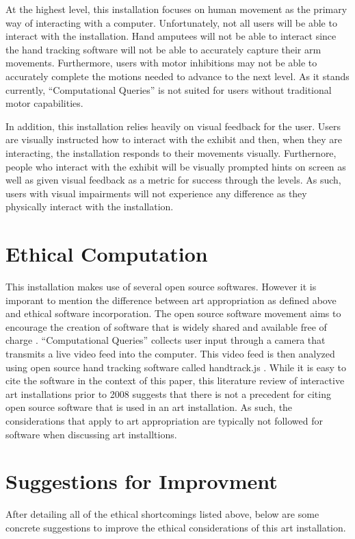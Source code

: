 \documentclass[10pt,twocolumn]{article}
\begin{document}
At the highest level, this installation focuses on human movement as the primary way of interacting with a computer.  Unfortunately, not all users will be able to interact with the installation.  Hand amputees will not be able to interact since the hand tracking software will not be able to accurately capture their arm movements. Furthermore, users with motor inhibitions may not be able to accurately complete the motions needed to advance to the next level.  As it stands currently, ``Computational Queries'' is not suited for users without traditional motor capabilities. 

In addition, this installation relies heavily on visual feedback for the user.  Users are visually instructed how to interact with the exhibit and then, when they are interacting, the installation responds to their movements visually.  Furthernore, people who interact with the exhibit will be visually prompted hints on screen as well as given visual feedback as a metric for success through the levels. As such, users with visual impairments will not experience any difference as they physically interact with the installation. 

\section{Ethical Computation}\label{sec:computation}
This installation makes use of several open source softwares. However it is imporant to mention the difference between art appropriation as defined above and ethical software incorporation.  The open source software movement aims to encourage the creation of software that is widely shared and available free of charge \cite{jackson_how_nodate}. ``Computational Queries'' collects user input through a camera that transmits a live video feed into the computer. This video feed is then analyzed using open source hand tracking software called handtrack.js \cite{handTrack.js_Dibia2017}.  While it is easy to cite the software in the context of this paper, this literature review of interactive art installations prior to 2008 suggests that there is not a precedent for citing open source software that is used in an art installation.  As such, the considerations that apply to art appropriation are typically not followed for software when discussing art installtions. 

\section{Suggestions for Improvment}\label{sec:suggestions}
After detailing all of the ethical shortcomings listed above, below are some concrete suggestions to improve the ethical considerations of this art installation. 
\end{document}
